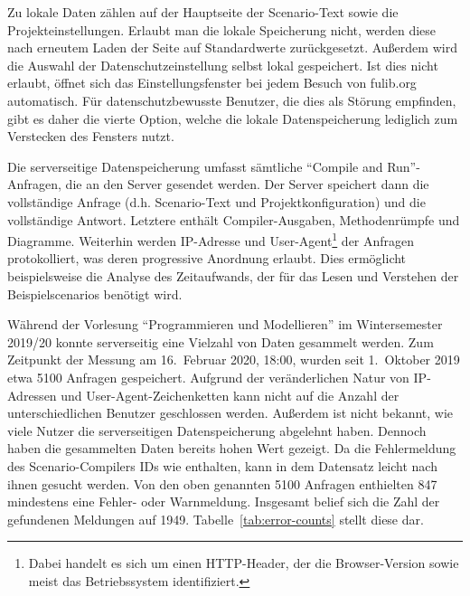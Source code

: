 Zu lokale Daten zählen auf der Hauptseite der Scenario-Text sowie die Projekteinstellungen.
Erlaubt man die lokale Speicherung nicht, werden diese nach erneutem Laden der Seite auf Standardwerte zurückgesetzt.
Außerdem wird die Auswahl der Datenschutzeinstellung selbst lokal gespeichert.
Ist dies nicht erlaubt, öffnet sich das Einstellungsfenster bei jedem Besuch von fulib.org automatisch.
Für datenschutzbewusste Benutzer, die dies als Störung empfinden, gibt es daher die vierte Option, welche die lokale Datenspeicherung lediglich zum Verstecken des Fensters nutzt.

Die serverseitige Datenspeicherung umfasst sämtliche ``Compile and Run''-Anfragen, die an den Server gesendet werden.
Der Server speichert dann die vollständige Anfrage (d.h. Scenario-Text und Projektkonfiguration) und die vollständige Antwort.
Letztere enthält Compiler-Ausgaben, Methodenrümpfe und Diagramme.
Weiterhin werden IP-Adresse und User-Agent\footnote{Dabei handelt es sich um einen HTTP-Header, der die Browser-Version sowie meist das Betriebssystem identifiziert.} der Anfragen protokolliert, was deren progressive Anordnung erlaubt.
Dies ermöglicht beispielsweise die Analyse des Zeitaufwands, der für das Lesen und Verstehen der Beispielscenarios benötigt wird.

Während der Vorlesung ``Programmieren und Modellieren'' im Wintersemester 2019/20 konnte serverseitig eine Vielzahl von Daten gesammelt werden.
Zum Zeitpunkt der Messung am 16.\ Februar 2020, 18:00, wurden seit 1.\ Oktober 2019 etwa 5100 Anfragen gespeichert.
Aufgrund der veränderlichen Natur von IP-Adressen und User-Agent-Zeichenketten kann nicht auf die Anzahl der unterschiedlichen Benutzer geschlossen werden.
Außerdem ist nicht bekannt, wie viele Nutzer die serverseitigen Datenspeicherung abgelehnt haben.
Dennoch haben die gesammelten Daten bereits hohen Wert gezeigt.
Da die Fehlermeldung des Scenario-Compilers IDs wie  enthalten, kann in dem Datensatz leicht nach ihnen gesucht werden.
Von den oben genannten 5100 Anfragen enthielten 847 mindestens eine Fehler- oder Warnmeldung.
Insgesamt belief sich die Zahl der gefundenen Meldungen auf 1949.
Tabelle~\ref{tab:error-counts} stellt diese dar.

